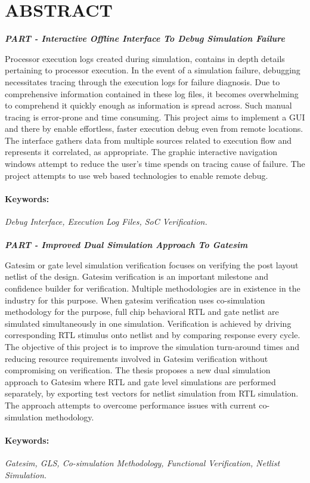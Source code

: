 \section*{\centering ABSTRACT}
\newcommand{\RNum}[1]{\uppercase\expandafter{\romannumeral #1\relax}}


\centerline{\emph{\bf PART \RNum{1}- Interactive Offline Interface To Debug Simulation Failure }}
\vspace{5pt}
Processor execution logs created during simulation, contains in depth details pertaining to processor execution.  In the event of a simulation failure, debugging necessitates tracing through the execution logs for failure diagnosis.  Due to comprehensive information contained in these log files, it becomes overwhelming to comprehend it quickly enough as information is spread across. Such manual tracing is error-prone and time consuming.
This project aims to implement a GUI  and there by enable effortless, faster execution debug even from remote locations. The interface gathers data from multiple sources related to execution flow and represents it correlated, as appropriate. The graphic interactive navigation windows attempt to reduce the user's time spends on tracing cause of failure. The project attempts to use web based technologies to enable remote debug.



\paragraph{Keywords:}
 \emph{Debug Interface, Execution Log Files, SoC  Verification.}


 \paragraph{}

\centerline{\emph{\bf PART \RNum{2}- Improved Dual Simulation Approach To Gatesim}}
\vspace{5pt}
Gatesim or gate level simulation verification focuses on verifying the post layout netlist of the design. Gatesim verification is an important milestone and confidence builder for verification. Multiple methodologies are in existence in the industry for this purpose. When gatesim verification uses co-simulation methodology for the purpose, full chip behavioral RTL  and gate netlist are simulated simultaneously in one simulation. Verification is achieved by driving corresponding RTL stimulus onto netlist and by comparing response every cycle.
The objective of this project is to improve the simulation turn-around times and reducing resource requirements involved in Gatesim verification without compromising on verification. The thesis proposes a new dual simulation approach to Gatesim where RTL and gate level simulations are performed separately, by exporting test vectors for netlist simulation from RTL simulation. The approach attempts to overcome performance issues with current co-simulation methodology.

\paragraph{Keywords:}
 \emph{Gatesim,  GLS,  Co-simulation Methodology,  Functional Verification, Netlist Simulation.}




